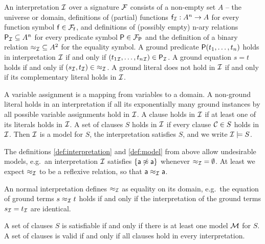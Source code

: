 \begin{definition}\label{def:interpretation}
	An {\myem interpretation} ${\mathcal I}$ over a signature ${\mathcal F}$ consists of a
	non-empty set $A$ -- the {\myem universe} or {\myem domain},
	definitions of (partial) functions ${\mathsf f}_{\mathcal I}: A^n\rightarrow A$ for every function symbol ${\mathsf f}\in{{\mathcal F}_{\mathsf f}}$, 
	and definitions of (possibly empty) n-ary relations 
	 ${{\mathsf P}_{\mathcal I}}\subseteq A^n$ for every predicate symbol ${\mathsf P}\in{{\mathcal F}_{\mathsf P}}$
	 and the definition of a binary relation ${\approx_{\mathcal I}}\subseteq A^2$ for the equality symbol.
%	
	A ground predicate ${\mathsf P}(t_1,\ldots,t_n)$ 
	{\myem holds} in interpretation ${\mathcal I}$ 
	if and only if $({t_1}_{\mathcal I},\ldots,{t_n}_{\mathcal I}) \in {\mathsf P}_{\mathcal I}$.
	A ground equation $s = t$ holds if and only if $(s_{\mathcal I},t_{\mathcal I}) \in {\approx_{\mathcal I}}$.
	A ground literal does not hold in ${\mathcal I}$ if and only if its complementary literal holds in ${\mathcal I}$.
%
\end{definition}
\begin{definition}\label{def:model}
	A variable {\myem assignment} is a mapping from variables to a domain.
	A non-ground literal holds in an interpretation
	if all its exponentially many ground instances by all possible 
	variable assignments hold in ${\mathcal I}$.
	A clause holds in ${\mathcal I}$ if at least one of its literals holds in ${\mathcal I}$.
	A set of clauses $S$ holds in ${\mathcal I}$ if every clause ${\mathcal C}\in S$ holds in ${\mathcal I}$.
	Then ${\mathcal I}$ is a model {\myem for} $S$, the interpretation satisfies $S$, and
	we write ${\mathcal I}\models S$. 
\end{definition}

\begin{example}The definitions \ref{def:interpretation} and \ref{def:model} 
	from above allow undesirable models, 
	e.g.~an interpretation ${\mathcal I}$ satisfies $\{ {\mathsf a}\not\approx{\mathsf a} \}$ 
		whenever ${\approx_{\mathcal I}} = \emptyset$.
	At least we expect $\approx_{\mathcal I}$ to be a reflexive relation, so that ${\mathsf a}\approx_{\mathcal I}{\mathsf a}$.
\end{example}

\begin{definition}
	An {\myem normal} interpretation defines $\approx_{\mathcal I}$ as equality on its domain,
	e.g.~the equation of ground terms $s \approx_{\mathcal I} t$ holds if and only 
	if the interpretation of the ground terms $s_{\mathcal I} = t_{\mathcal I}$ are identical.
\end{definition}

\begin{definition}
	A set of clauses $S$ is {\myem satisfiable} if and only if there is at least one model ${\mathcal M}$ for $S$. 
	A set of clauses is  {\myem valid} if and only if all clauses hold in every interpretation.
\end{definition}

